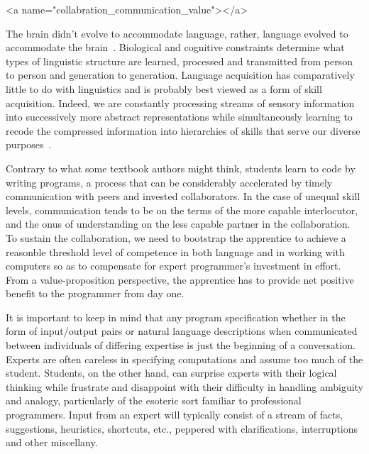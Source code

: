 
\rawhtml
<a name="collabration_communication_value"></a>
\endrawhtml
{}


The brain didn't evolve to accommodate language, rather, language evolved to accommodate the brain~\cite{ChaterandChristiansenHLB-11}. Biological and cognitive constraints determine what types of linguistic structure are learned, processed and transmitted from person to person and generation to generation. Language acquisition has comparatively little to do with linguistics and is probably best viewed as a form of skill acquisition. Indeed, we are constantly processing streams of sensory information into successively more abstract representations while simultaneously learning to recode the compressed information into hierarchies of skills that serve our diverse purposes~\cite{ChaterandChristiansenCOiBS-18,ChateretalJML-16}.

Contrary to what some textbook authors might think, students learn to code by writing programs, a process that can be considerably accelerated by timely communication with peers and invested collaborators. In the case of unequal skill levels, communication tends to be on the terms of the more capable interlocutor, and the onus of understanding on the less capable partner in the collaboration. To sustain the collaboration, we need to bootstrap the apprentice to achieve a reasonble threshold level of competence in both language and in working with computers so as to compensate for expert programmer's investment in effort. From a value-proposition perspective, the apprentice has to provide net positive benefit to the programmer from day one.

It is important to keep in mind that any program specification whether in the form of input/output pairs or natural language descriptions when communicated between individuals of differing expertise is just the beginning of a conversation. Experts are often careless in specifying computations and assume too much of the student. Students, on the other hand, can surprise experts with their logical thinking while frustrate and disappoint with their difficulty in handling ambiguity and analogy, particularly of the esoteric sort familiar to professional programmers. Input from an expert will typically consist of a stream of facts, suggestions, heuristics, shortcuts, etc., peppered with clarifications, interruptions and other miscellany.

